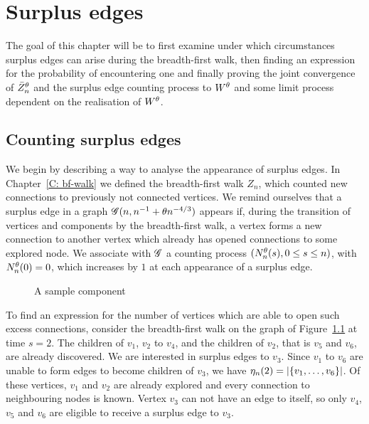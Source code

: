 
\chapter{Surplus edges} \label{C: surplus edges}

The goal of this chapter will be to first examine under which circumstances surplus edges can arise during the breadth-first walk,
then finding an expression for the probability of encountering one 
and finally proving the joint convergence of $\bar{Z}^{\theta}_n$ and the surplus edge counting process to $W^{\theta}$ and some limit process dependent on the realisation of $W^{\theta}$.


\section{Counting surplus edges}

We begin by describing a way to analyse the appearance of surplus edges.
In Chapter~\ref{C: bf-walk} we defined the breadth-first walk $Z_n$, 
which counted new connections to previously not connected vertices.
We remind ourselves that a surplus edge in a graph $\mathscr{G}(n, n^{-1} + \theta n^{-4/3})$ appears if,
during the transition of vertices and components by the breadth-first walk,
a vertex forms a new connection to another vertex
which already has opened connections to some explored node.
We associate with $\mathscr{G}$ a counting process $(N_n^{\theta}(s), 0 \leq s \leq n)$,
with $N_n^{\theta}(0) = 0$, which increases by $1$ at each appearance of a surplus edge.

\begin{figure}[h]
	\centering
	\scalebox{0.85}{
		
	}
	\caption{A sample component} 
	\label{F: Surplus Edges Tree}
\end{figure}

To find an expression for the number of vertices which are able to open such excess connections, 
consider the breadth-first walk on the graph of Figure~\ref{F: Surplus Edges Tree} at time $s=2$.
The children of $v_1$, $v_2$ to $v_4$, and the children of $v_2$, that is $v_5$ and $v_6$, are already discovered.
We are interested in surplus edges to $v_3$.
Since $v_1$ to $v_6$ are unable to form edges to become children of $v_3$, we have $\eta_n(2) = |\{ v_1, \dots,  v_6\}|$.
Of these vertices, $v_1$ and $v_2$ are already explored and every connection to neighbouring nodes is known.
Vertex $v_3$ can not have an edge to itself, so only $v_4$, $v_5$ and $v_6$ are eligible to receive a surplus edge to $v_3$.

